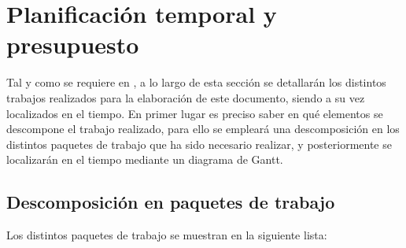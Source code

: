 \chapter{Planificación temporal y presupuesto}

Tal y como se requiere en \cite{website:procTFG}, a lo largo de esta sección se detallarán los distintos trabajos realizados para la elaboración de este documento, siendo a su vez localizados en el tiempo. En primer lugar es preciso saber en qué elementos se descompone el trabajo realizado, para ello se empleará una descomposición en los distintos paquetes de trabajo que ha sido necesario realizar, y posteriormente se localizarán en el tiempo mediante un diagrama de Gantt. \par 

\section*{Descomposición en paquetes de trabajo}

Los distintos paquetes de trabajo se muestran en la siguiente lista: 


